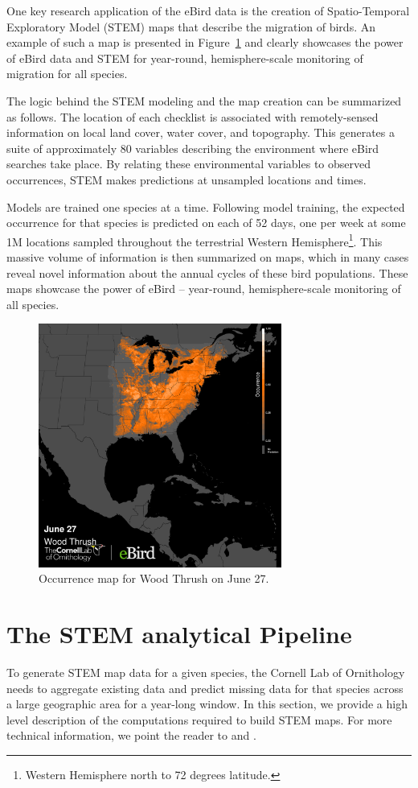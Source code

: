 \documentclass{acm_proc_article-sp}
\begin{document}
One key research application of the eBird data is the creation of Spatio-Temporal Exploratory Model (STEM) maps that describe the migration of birds. An example of such a map is presented in Figure~\ref{fig::stem} and clearly showcases the power of eBird data and STEM for year-round, hemisphere-scale monitoring of migration for all species.

The logic behind the STEM modeling and the map creation can be summarized as follows. The location of each checklist is associated with remotely-sensed information on local land cover, water cover, and topography. This generates a suite of approximately 80 variables describing the environment where eBird searches take place. By relating these environmental variables to observed occurrences, STEM makes predictions at unsampled locations and times. 

Models are trained one species at a time. Following model training, the expected occurrence for that species is predicted on each of 52 days, one per week at some 1M locations sampled throughout the terrestrial Western Hemisphere\footnote{Western Hemisphere north to 72 degrees latitude.}. This massive volume of information is then summarized on maps, which in many cases reveal novel information about the annual cycles of these bird populations. These maps showcase the power of eBird -- year-round, hemisphere-scale monitoring of all species.

\begin{figure}[h]
    \centering
    \includegraphics[width=8cm]{IMG/stem.png}
    \caption{Occurrence map for Wood Thrush on June 27.}
    \label{fig::stem}
\end{figure}

\section{The STEM analytical Pipeline}
To generate STEM map data for a given species, the Cornell Lab of Ornithology needs to aggregate existing data and predict missing data for that species across a large geographic area for a year-long window. In this section, we provide a high level description of the computations required to build STEM maps. For more technical information, we point the reader to \cite{Fink2010-fb} and \cite{Johnston2015-pf}.
\end{document}

